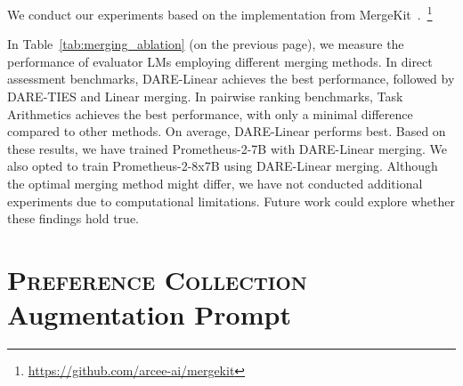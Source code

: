 \documentclass[11pt]{article}
\begin{document}
We conduct our experiments based on the implementation from MergeKit~\citep{goddard2024arcee}.~\footnote{\href{https://github.com/arcee-ai/mergekit}{https://github.com/arcee-ai/mergekit}}

In Table~\ref{tab:merging_ablation} (on the previous page), we measure the performance of evaluator LMs employing different merging methods. In direct assessment benchmarks, DARE-Linear achieves the best performance, followed by DARE-TIES and Linear merging. In pairwise ranking benchmarks, Task Arithmetics achieves the best performance, with only a minimal difference compared to other methods. On average, DARE-Linear performs best. Based on these results, we have trained Prometheus-2-7B with DARE-Linear merging. We also opted to train Prometheus-2-8x7B using DARE-Linear merging. Although the optimal merging method might differ, we have not conducted additional experiments due to computational limitations. Future work could explore whether these findings hold true.











\clearpage

\section{\textsc{Preference Collection} Augmentation Prompt}\label{appendix:augmentation_prompt}
\end{document}
